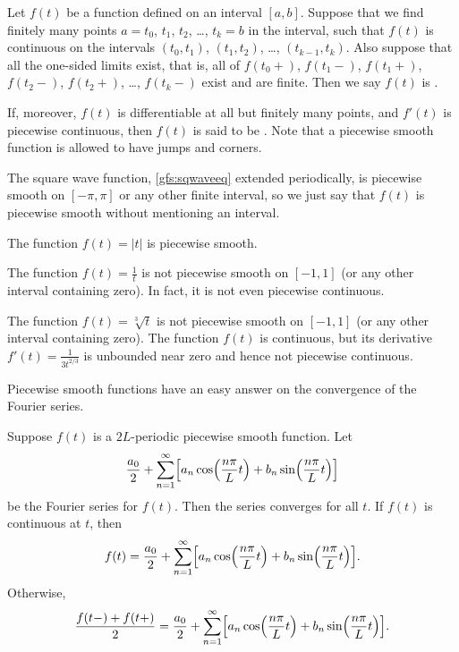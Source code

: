 Let $f(t)$ be a function defined on an interval $[a,b]$.  Suppose
that we find finitely many points
$a=t_0$, $t_1$, $t_2$, \ldots, $t_k=b$ in
the interval, such that $f(t)$ is continuous
on the intervals
$(t_0,t_1)$, 
$(t_1,t_2)$, \ldots, 
$(t_{k-1},t_k)$.
Also suppose that all the one-sided limits exist, that is,
all of
$f(t_0+)$,
$f(t_1-)$,
$f(t_1+)$,
$f(t_2-)$,
$f(t_2+)$,
\ldots,
$f(t_k-)$
exist and are finite.
Then
we say $f(t)$ is \emph{}.

If, moreover, $f(t)$ is differentiable at all but finitely many points,
and $f'(t)$ is piecewise continuous, then 
$f(t)$ is said to be \emph{}.
Note that a piecewise smooth function is allowed to have
jumps and corners.

\begin{example}
The square wave function, \eqref{gfs:sqwaveeq} extended periodically,
is piecewise smooth on $[-\pi,\pi]$ or any other finite interval, so
we just say that $f(t)$ is
piecewise smooth without mentioning an interval.
\end{example}

\begin{example}
The function $f(t) = \lvert t \rvert$
is piecewise smooth.
\end{example}

\begin{example}
The function $f(t) = \frac{1}{t}$ is not piecewise smooth on
$[-1,1]$ (or any other interval containing zero).  In fact, it is not
even piecewise continuous.
\end{example}

\begin{example}
The function $f(t) = \sqrt[3]{t}$ is not piecewise smooth on
$[-1,1]$ (or any other interval containing zero).  
The function $f(t)$ is continuous, but
its derivative $f'(t) = \frac{1}{3t^{2/3}}$ is unbounded near zero and hence not piecewise
continuous.
\end{example}

Piecewise smooth functions have an easy answer on the convergence
of the Fourier series.

\begin{theorem}
Suppose $f(t)$ is a $2L$-periodic piecewise smooth function.
Let
\begin{equation*}
\frac{a_0}{2} + \sum_{n=1}^\infty
\Bigl[
a_n \cos \Bigl( \frac{n \pi}{L} t \Bigr)
+ b_n \sin \Bigl( \frac{n \pi}{L} t \Bigr)
\Bigr]
\end{equation*}
be the Fourier series for $f(t)$.  Then the series converges
for all $t$.  If $f(t)$ is continuous
at $t$, then
\begin{equation*}
f(t) = \frac{a_0}{2} + \sum_{n=1}^\infty
\Bigl[
a_n \cos \Bigl( \frac{n \pi}{L} t \Bigr)
+ b_n \sin \Bigl( \frac{n \pi}{L} t \Bigr)
\Bigr] .
\end{equation*}
Otherwise,
\begin{equation*}
\frac{f(t-)+f(t+)}{2} =
\frac{a_0}{2} + \sum_{n=1}^\infty
\Bigl[
a_n \cos \Bigl( \frac{n \pi}{L}  t \Bigr)
+ b_n \sin \Bigl( \frac{n \pi}{L} t \Bigr)
\Bigr] .
\end{equation*}
\end{theorem}

